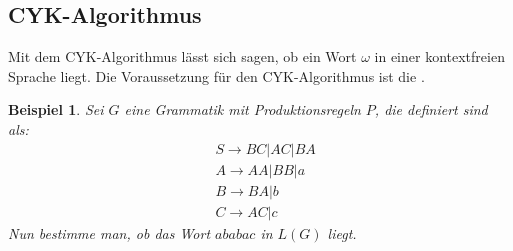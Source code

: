 \documentclass[12pt, oneside]{book}
\newtheorem{bsp}{Beispiel}
\begin{document}
\subsection{CYK-Algorithmus}
\label{cyk}
Mit dem CYK-Algorithmus lässt sich sagen, ob ein Wort $\omega$ in einer kontextfreien Sprache liegt. Die Voraussetzung für den CYK-Algorithmus ist die .
\begin{bsp}
    Sei $G$ eine Grammatik mit Produktionsregeln $P$, die definiert sind als:
    \begin{align*}
        &S\to BC|AC|BA\\
        &A\to AA|BB|a\\
        &B\to BA|b\\
        &C\to AC|c
    \end{align*}
    Nun bestimme man, ob das Wort $ababac$ in $L(G)$ liegt.
\end{bsp}
\end{document}
